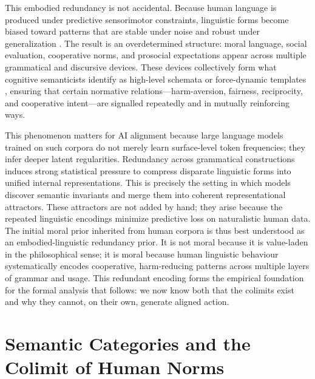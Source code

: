 \documentclass[12pt]{article}
\theoremstyle{definition}
\begin{document}
This embodied redundancy is not accidental. Because human language is produced
under predictive sensorimotor constraints, linguistic forms become biased toward
patterns that are stable under noise and robust under generalization
\citep{Clark2013,Hohwy2013}. The result is an overdetermined structure: moral
language, social evaluation, cooperative norms, and prosocial expectations
appear across multiple grammatical and discursive devices. These devices
collectively form what cognitive semanticists identify as high-level schemata or
force-dynamic templates \citep{Talmy2000}, ensuring that certain normative
relations---harm-aversion, fairness, reciprocity, and cooperative intent---are
signalled repeatedly and in mutually reinforcing ways.

This phenomenon matters for AI alignment because large language models trained
on such corpora do not merely learn surface-level token frequencies; they infer
deeper latent regularities. Redundancy across grammatical constructions induces
strong statistical pressure to compress disparate linguistic forms into unified
internal representations. This is precisely the setting in which models
discover semantic invariants and merge them into coherent representational
attractors. These attractors are not added by hand; they arise because the
repeated linguistic encodings minimize predictive loss on naturalistic human
data. The initial moral prior inherited from human corpora is thus best
understood as an embodied-linguistic redundancy prior. It is not moral because
it is value-laden in the philosophical sense; it is moral because human
linguistic behaviour systematically encodes cooperative, harm-reducing patterns
across multiple layers of grammar and usage. This redundant encoding forms the
empirical foundation for the formal analysis that follows: we now know both that
the colimits exist and why they cannot, on their own, generate aligned action.

\section{Semantic Categories and the Colimit of Human Norms}
\end{document}
